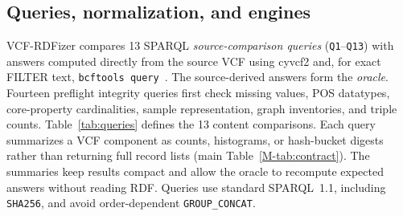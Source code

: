 \documentclass[11pt]{article}
\begin{document}
\subsection{Queries, normalization, and engines}\label{subsec:validation-queries}
VCF-RDFizer compares 13 SPARQL \emph{source-comparison queries} (\texttt{Q1}--\texttt{Q13}) with answers computed directly from the source VCF using cyvcf2 and, for exact FILTER text, \texttt{bcftools query}~\cite{vcf_intro,BCFtools,cyvcf2_2017}.
The source-derived answers form the \emph{oracle}.
Fourteen preflight integrity queries first check missing values, POS datatypes, core-property cardinalities, sample representation, graph inventories, and triple counts.
Table~\ref{tab:queries} defines the 13 content comparisons.
Each query summarizes a VCF component as counts, histograms, or hash-bucket digests rather than returning full record lists (main Table~\ref{M-tab:contract}).
The summaries keep results compact and allow the oracle to recompute expected answers without reading RDF.
Queries use standard SPARQL~1.1, including \texttt{SHA256}, and avoid order-dependent \texttt{GROUP\_CONCAT}.
\end{document}
